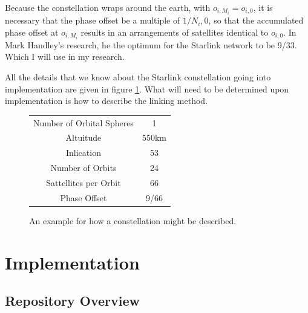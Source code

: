 \documentclass[12pt]{report}
\begin{document}
Because the constellation wraps around the earth, with $o_{i,M_i} = o_{i,0}$, it is necessary that the phase offset be a multiple of $1/N_i,0$, so that the accumulated phase offset at $o_{i,M_i}$ results in an arrangements of satellites identical to $o_{i,0}$. In Mark Handley's research, he the optimum for the Starlink network to be 9/33. Which I will use in my research.


All the details that we know about the Starlink constellation going into implementation are given in figure \ref{fig:Starlink Within Program}. What will need to be determined upon implementation is how to describe the linking method.

\begin{figure}
\caption{An example for how a constellation might be described.}
\label{fig:Starlink Within Program}
\begin{center}
\begin{tabular}{ | c | c  | }
	\hline
	Number of Orbital Spheres & 1 \\
	Altuitude & 550km \\
	Inlication & 53\degree\\
	Number of Orbits & 24\\
	Sattellites per Orbit & 66\\
	Phase Offset & 9/66\\
	\hline
\end{tabular}
\end{center}
\end{figure}

\chapter{Implementation}

\section{Repository Overview}
\end{document}
